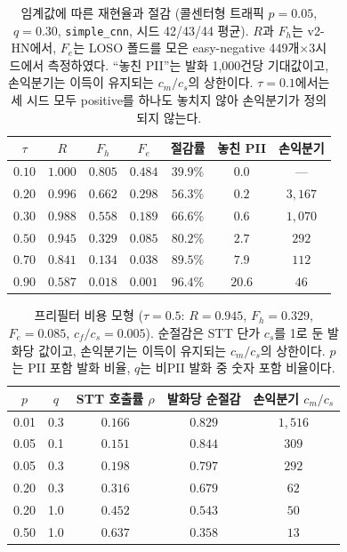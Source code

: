 \documentclass[10pt,twocolumn]{article}
\begin{document}
\begin{table}[!t]
\centering
\caption{임계값에 따른 재현율과 절감 (콜센터형 트래픽 $p=0.05$, $q=0.30$, \texttt{simple\_cnn},
시드 42/43/44 평균). $R$과 $F_h$는 v2-HN에서, $F_e$는 LOSO 폴드를 모은 easy-negative
449개$\times$3시드에서 측정하였다. ``놓친 PII''는 발화 1{,}000건당 기대값이고, 손익분기는 이득이
유지되는 $c_m/c_s$의 상한이다. $\tau=0.1$에서는 세 시드 모두 positive를 하나도 놓치지 않아
손익분기가 정의되지 않는다.}
\label{tab:tau}
\footnotesize
\setlength{\tabcolsep}{4pt}
\begin{tabular}{ccccccc}
\toprule
$\tau$ & $R$ & $F_h$ & $F_e$ & 절감률 & 놓친 PII & 손익분기 \\
\midrule
$0.10$ & $\mathbf{1.000}$ & $0.805$ & $0.484$ & $39.9\%$ & $\mathbf{0.0}$ & --- \\
$0.20$ & $0.996$ & $0.662$ & $0.298$ & $56.3\%$ & $0.2$ & $3{,}167$ \\
$0.30$ & $0.988$ & $0.558$ & $0.189$ & $66.6\%$ & $0.6$ & $1{,}070$ \\
$0.50$ & $0.945$ & $0.329$ & $0.085$ & $\mathbf{80.2\%}$ & $2.7$ & $292$ \\
$0.70$ & $0.841$ & $0.134$ & $0.038$ & $89.5\%$ & $7.9$ & $112$ \\
$0.90$ & $0.587$ & $0.018$ & $0.001$ & $96.4\%$ & $20.6$ & $46$ \\
\bottomrule
\end{tabular}
\end{table}

\begin{table}[!t]
\centering
\caption{프리필터 비용 모형 ($\tau=0.5$: $R=0.945$, $F_h=0.329$, $F_e=0.085$, $c_f/c_s=0.005$). 순절감은
STT 단가 $c_s$를 1로 둔 발화당 값이고, 손익분기는 이득이 유지되는 $c_m/c_s$의 상한이다. $p$는
PII 포함 발화 비율, $q$는 비PII 발화 중 숫자 포함 비율이다.}
\label{tab:cost}
\footnotesize
\setlength{\tabcolsep}{5pt}
\begin{tabular}{ccccc}
\toprule
$p$ & $q$ & STT 호출률 $\rho$ & 발화당 순절감 & 손익분기 $c_m/c_s$ \\
\midrule
0.01 & 0.3 & $0.166$ & $0.829$ & $1{,}516$ \\
0.05 & 0.1 & $0.151$ & $0.844$ & $309$ \\
0.05 & 0.3 & $0.198$ & $0.797$ & $292$ \\
0.20 & 0.3 & $0.316$ & $0.679$ & $62$ \\
0.20 & 1.0 & $0.452$ & $0.543$ & $50$ \\
0.50 & 1.0 & $0.637$ & $0.358$ & $13$ \\
\bottomrule
\end{tabular}
\end{table}
\end{document}
